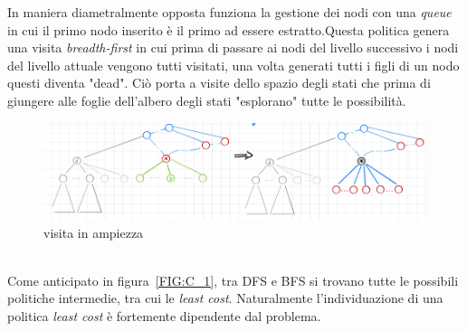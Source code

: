 \documentclass[a4paper]{article}
\begin{document}
In maniera diametralmente opposta funziona la gestione dei nodi con una \emph{queue} in cui il primo nodo inserito è il primo ad essere estratto.Questa politica genera una visita \textit{breadth-first} in cui prima di passare ai nodi del livello successivo i nodi del livello attuale vengono tutti visitati, una volta generati tutti i figli di un nodo questi diventa "dead".
Ciò porta a visite dello spazio degli stati che prima di giungere alle foglie dell'albero degli stati "esplorano" tutte le possibilità.
\begin{figure}[!ht]
\centering
\includegraphics[width=1\textwidth]{./img/C_1_BFS.png}
\caption{visita in ampiezza} \label{FIG:C_1_BFS}
\end{figure}\\
Come anticipato in figura~\ref{FIG:C_1}, tra DFS e BFS si trovano tutte le possibili politiche intermedie, tra cui le \textit{least cost}. Naturalmente l'individuazione di una politica \textit{least cost} è fortemente dipendente dal problema.
\end{document}
